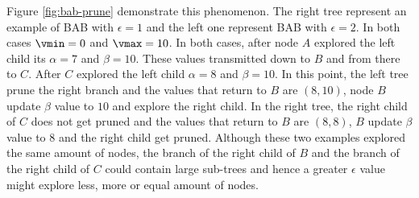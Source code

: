 Figure \ref{fig:bab-prune} demonstrate this phenomenon. The right tree represent an example of BAB with $\epsilon = 1$ and the left one represent BAB with $\epsilon = 2$. In both cases $\vmin = 0$ and $\vmax = 10$. In both cases, after node $A$ explored the left child its $\alpha = 7$ and $\beta = 10$. These values transmitted down to $B$ and from there to $C$. After $C$ explored the left child $\alpha = 8$ and $\beta = 10$. In this point, the left tree prune the right branch and the values that return to $B$ are $(8,10)$, node $B$ update $\beta$ value to $10$ and explore the right child. In the right tree, the right child of $C$ does not get pruned and the values that return to $B$ are $(8,8)$, $B$ update $\beta$ value to $8$ and the right child get pruned. Although these two examples explored the same amount of nodes, the branch of the right child of $B$ and the branch of the right child of $C$ could contain large sub-trees and hence a greater $\epsilon$ value might explore less, more or equal amount of nodes. 






